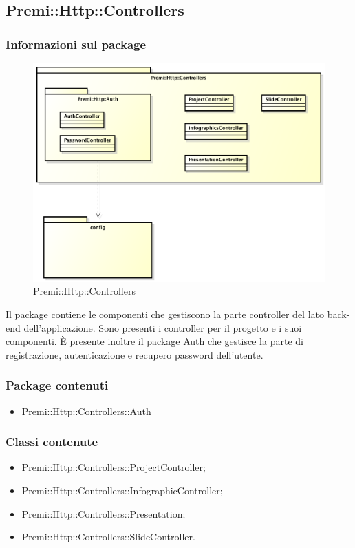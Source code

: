 \newpage
\subsection{Premi::Http::Controllers}
	\subsubsection*{Informazioni sul package}
	\begin{figure}[h]
		\centering
		\includegraphics[width=0.9\linewidth]{img/premi_http_controllers}
		\caption[Premi::Http::Controllers]{Premi::Http::Controllers}
	\end{figure}
	Il package contiene le componenti che gestiscono la parte controller del lato \gls{back-end} dell'applicazione. 
	Sono presenti i controller per il progetto e i suoi componenti. È presente inoltre il package Auth che gestisce la parte di registrazione, autenticazione e recupero password dell'utente. 

	\subsubsection*{Package contenuti}
		\begin{itemize}
			\item Premi::Http::Controllers::Auth
		\end{itemize}
	\subsubsection*{Classi contenute}
		\begin{itemize}
			\item Premi::Http::Controllers::ProjectController;
			\item Premi::Http::Controllers::InfographicController;
			\item Premi::Http::Controllers::Presentation;
			\item Premi::Http::Controllers::SlideController.
		\end{itemize}
		
